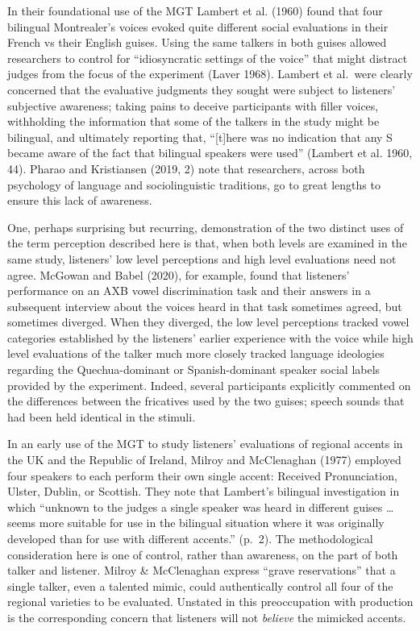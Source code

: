 \documentclass[
  letterpaper,
  DIV=11,
  numbers=noendperiod]{scrartcl}
\begin{document}
In their foundational use of the MGT Lambert et al. (1960) found that
four bilingual Montrealer's voices evoked quite different social
evaluations in their French vs their English guises. Using the same
talkers in both guises allowed researchers to control for
``idiosyncratic settings of the voice'' that might distract judges from
the focus of the experiment (Laver 1968). Lambert et al.~were clearly
concerned that the evaluative judgments they sought were subject to
listeners' subjective awareness; taking pains to deceive participants
with filler voices, withholding the information that some of the talkers
in the study might be bilingual, and ultimately reporting that,
``{[}t{]}here was no indication that any S became aware of the fact that
bilingual speakers were used'' (Lambert et al. 1960, 44). Pharao and
Kristiansen (2019, 2) note that researchers, across both psychology of
language and sociolinguistic traditions, go to great lengths to ensure
this lack of awareness.

One, perhaps surprising but recurring, demonstration of the two distinct
uses of the term perception described here is that, when both levels are
examined in the same study, listeners' low level perceptions and high
level evaluations need not agree. McGowan and Babel (2020), for example,
found that listeners' performance on an AXB vowel discrimination task
and their answers in a subsequent interview about the voices heard in
that task sometimes agreed, but sometimes diverged. When they diverged,
the low level perceptions tracked vowel categories established by the
listeners' earlier experience with the voice while high level
evaluations of the talker much more closely tracked language ideologies
regarding the Quechua-dominant or Spanish-dominant speaker social labels
provided by the experiment. Indeed, several participants explicitly
commented on the differences between the fricatives used by the two
guises; speech sounds that had been held identical in the stimuli.

In an early use of the MGT to study listeners' evaluations of regional
accents in the UK and the Republic of Ireland, Milroy and McClenaghan
(1977) employed four speakers to each perform their own single accent:
Received Pronunciation, Ulster, Dublin, or Scottish. They note that
Lambert's bilingual investigation in which ``unknown to the judges a
single speaker was heard in different guises \ldots{} seems more
suitable for use in the bilingual situation where it was originally
developed than for use with different accents.'' (p.~2). The
methodological consideration here is one of control, rather than
awareness, on the part of both talker and listener. Milroy \&
McClenaghan express ``grave reservations'' that a single talker, even a
talented mimic, could authentically control all four of the regional
varieties to be evaluated. Unstated in this preoccupation with
production is the corresponding concern that listeners will not
\emph{believe} the mimicked accents.
\end{document}
